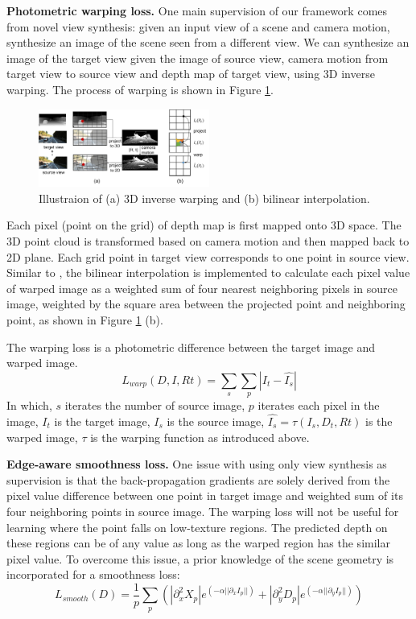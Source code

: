 \documentclass[letterpaper]{article} %
\begin{document}
\textbf{Photometric warping loss.} One main supervision of our framework comes from novel view synthesis: given an input view of a scene and camera motion, synthesize an image of the scene seen from a different view. We can synthesize an image of the target view given the image of source view, camera motion from target view to source view and depth map of target view, using 3D inverse warping. The process of warping is shown in Figure \ref{fig:3d_warping}.
\begin{figure}
\centering
\includegraphics[width=0.5\textwidth]{figures/3d_warping.pdf}
\caption{Illustraion of (a) 3D inverse warping and (b) bilinear interpolation.}
\label{fig:3d_warping}
\end{figure}
Each pixel (point on the grid) of depth map is first mapped onto 3D space. The 3D point cloud is transformed based on camera motion and then mapped back to 2D plane. Each grid point in target view corresponds to one point in source view. Similar to \cite{jaderberg2015spatial}, the bilinear interpolation is implemented to calculate each pixel value of warped image as a weighted sum of four nearest neighboring pixels in source image, weighted by the square area between the projected point and neighboring point, as shown in Figure \ref{fig:3d_warping} (b).

The warping loss is a photometric difference between the target image and warped image. $$L_{warp}(D, I, Rt) = \sum_s\sum_p|I_t - \hat{I_s}|$$
In which, $s$ iterates the number of source image, $p$ iterates each pixel in the image, $I_t$ is the target image, $I_s$ is the source image, $\hat{I_s} = \tau(I_s, D_t, Rt)$ is the warped image, $\tau$ is the warping function as introduced above.

\textbf{Edge-aware smoothness loss.} One issue with using only view synthesis as supervision is that the back-propagation gradients are solely derived from the pixel value difference between one point in target image and weighted sum of its four neighboring points in source image. The warping loss will not be useful for learning where the point falls on low-texture regions. The predicted depth on these regions can be of any value as long as the warped region has the similar pixel value.  To overcome this issue, a prior knowledge of the scene geometry is incorporated for a smoothness loss:
\small
$$L_{smooth}(D) = \frac{1}{p} \sum_{p}(|\partial^2_xX_p|e^{(-\alpha||\partial_xI_p||)} + |\partial^2_yD_p|e^{(-\alpha||\partial_yI_p||)})$$
\normalsize
\end{document}
